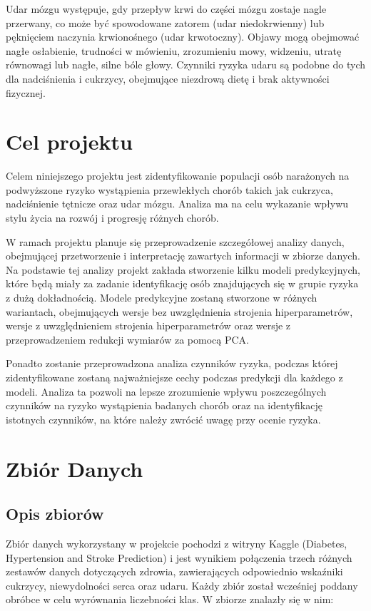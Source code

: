 \documentclass[onecolumn,12pt]{article}
\begin{document}
\vspace{8pt}
\noindent
Udar mózgu występuje, gdy przepływ krwi do części mózgu zostaje nagle przerwany, co może być spowodowane zatorem (udar niedokrwienny) lub pęknięciem naczynia krwionośnego (udar krwotoczny). Objawy mogą obejmować nagłe osłabienie, trudności w mówieniu, zrozumieniu mowy, widzeniu, utratę równowagi lub nagłe, silne bóle głowy. Czynniki ryzyka udaru są podobne do tych dla nadciśnienia i cukrzycy, obejmujące niezdrową dietę i brak aktywności fizycznej.

\newpage
\section{Cel projektu}
\noindent
Celem niniejszego projektu jest zidentyfikowanie populacji osób narażonych na podwyższone ryzyko wystąpienia przewlekłych chorób takich jak cukrzyca, nadciśnienie tętnicze oraz udar mózgu. Analiza ma na celu wykazanie wpływu stylu życia na rozwój i progresję różnych chorób.

\vspace{8pt}
\noindent
W ramach projektu planuje się przeprowadzenie szczegółowej analizy danych, obejmującej przetworzenie i interpretację zawartych informacji w zbiorze danych. Na podstawie tej analizy projekt zakłada stworzenie kilku modeli predykcyjnych, które będą miały za zadanie identyfikację osób znajdujących się w grupie ryzyka z dużą dokładnością. Modele predykcyjne zostaną stworzone w różnych wariantach, obejmujących wersje bez uwzględnienia strojenia hiperparametrów, wersje z uwzględnieniem strojenia hiperparametrów oraz wersje z przeprowadzeniem redukcji wymiarów za pomocą PCA.

\vspace{8pt}
\noindent
Ponadto zostanie przeprowadzona analiza czynników ryzyka, podczas której zidentyfikowane zostaną najważniejsze cechy podczas predykcji dla każdego z modeli. Analiza ta pozwoli na lepsze zrozumienie wpływu poszczególnych czynników na ryzyko wystąpienia badanych chorób oraz na identyfikację istotnych czynników, na które należy zwrócić uwagę przy ocenie ryzyka.
        
\section{Zbiór Danych}

\subsection{Opis zbiorów}
\noindent
Zbiór danych wykorzystany w projekcie pochodzi z witryny Kaggle (Diabetes, Hypertension and Stroke Prediction) i jest wynikiem połączenia trzech różnych zestawów danych dotyczących zdrowia, zawierających odpowiednio wskaźniki cukrzycy, niewydolności serca oraz udaru. Każdy zbiór został wcześniej poddany obróbce w celu wyrównania liczebności klas. W zbiorze znalazły się w nim:
\end{document}
